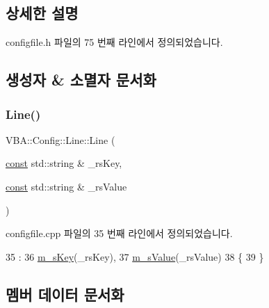 \subsection{상세한 설명}


configfile.\+h 파일의 75 번째 라인에서 정의되었습니다.



\subsection{생성자 \& 소멸자 문서화}
\mbox{\label{class_v_b_a_1_1_config_1_1_line_a79482ad95747330d0b31e862410a2e41}} 
\subsubsection{\texorpdfstring{Line()}{Line()}}
{\footnotesize\ttfamily V\+B\+A\+::\+Config\+::\+Line\+::\+Line (\begin{DoxyParamCaption}\item[{\mbox{\hyperlink{getopt1_8c_a2c212835823e3c54a8ab6d95c652660e}{const}} std\+::string \&}]{\+\_\+rs\+Key,  }\item[{\mbox{\hyperlink{getopt1_8c_a2c212835823e3c54a8ab6d95c652660e}{const}} std\+::string \&}]{\+\_\+rs\+Value }\end{DoxyParamCaption})}



configfile.\+cpp 파일의 35 번째 라인에서 정의되었습니다.


\begin{DoxyCode}
35                                                          :
36   \mbox{\hyperlink{class_v_b_a_1_1_config_1_1_line_a24c2691b23a1e55614f5c7f493199fa0}{m\_sKey}}(\_rsKey),
37   \mbox{\hyperlink{class_v_b_a_1_1_config_1_1_line_a49ce629848d486c0a3f0ee4e5d7d015a}{m\_sValue}}(\_rsValue)
38 \{
39 \}
\end{DoxyCode}


\subsection{멤버 데이터 문서화}
\mbox{\label{class_v_b_a_1_1_config_1_1_line_a24c2691b23a1e55614f5c7f493199fa0}} 
